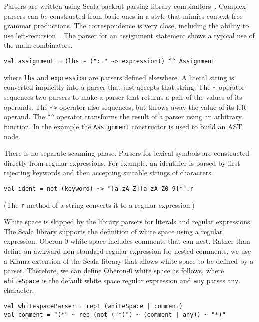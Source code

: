 Parsers are written using Scala packrat parsing library combinators~\cite[chapter 33]{Odersky10d}.
Complex parsers can be constructed from basic ones in a style that mimics context-free grammar productions.
The correspondence is very close, including the ability to use left-recursion~\cite{Warth08}.
The parser for an assignment statement shows a typical use of the main combinators.

\begin{verbatim}
val assignment = (lhs ~ (":=" ~> expression)) ^^ Assignment
\end{verbatim}

\noindent
where \verb|lhs| and \verb|expression| are parsers defined elsewhere.
A literal string is converted implicitly into a parser that just accepts that string.
The \verb|~| operator sequences two parsers to make a parser that returns a pair of the values of its operands.
The \verb|~>| operator also sequences, but throws away the value of its left operand.
The \verb|^^| operator transforms the result of a parser using an arbitrary function.
In the example the \verb|Assignment| constructor is used to build an AST node.

There is no separate scanning phase.
Parsers for lexical symbols are constructed directly from regular expressions.
For example, an identifier is parsed by first rejecting keywords and then accepting suitable strings of characters.

\begin{verbatim}
val ident = not (keyword) ~> "[a-zA-Z][a-zA-Z0-9]*".r
\end{verbatim}

\noindent
(The \verb|r| method of a string converts it to a regular expression.)

White space is skipped by the library parsers for literals and regular expressions.
The Scala library supports the definition of white space using a regular expression.
Oberon-0 white space includes comments that can nest.
Rather than define an awkward non-standard regular expression for nested comments, we use a Kiama extension of the Scala library that allows white space to be defined by a parser.
Therefore, we can define Oberon-0 white space as follows, where \verb|whiteSpace| is the default white space regular expression and \verb|any| parses any character.

\begin{verbatim}
val whitespaceParser = rep1 (whiteSpace | comment)
val comment = "(*" ~ rep (not ("*)") ~ (comment | any)) ~ "*)"
\end{verbatim}

